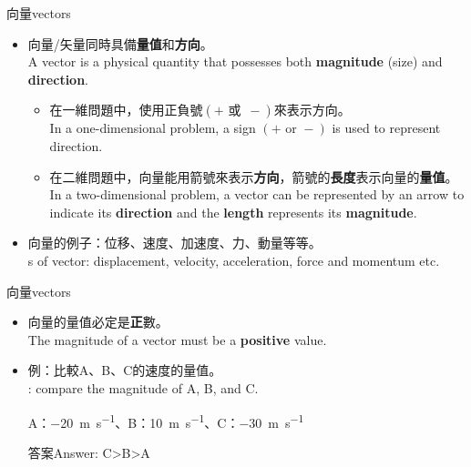 \documentclass[beamer=true]{standalone}
\begin{document}
\begin{frame}{向量vectors}
    \begin{itemize}
        \item 向量/矢量同時具備\textbf{量值}和\textbf{方向}。\\A vector is a physical quantity that possesses both \textbf{magnitude} (size) and \textbf{direction}.
              \begin{itemize}
                  \item 在一維問題中，使用正負號$(+ \textrm{ 或 }\, -)$來表示方向。\\In a one-dimensional problem, a sign $(+ \textrm{ or } -)$ is used to represent direction.
                  \item 在二維問題中，向量能用箭號來表示\textbf{方向}，箭號的\textbf{長度}表示向量的\textbf{量值}。\\In a two-dimensional problem, a vector can be represented by an arrow to indicate its \textbf{direction} and the \textbf{length} represents its \textbf{magnitude}.
              \end{itemize}
        \item 向量的例子：位移、速度、加速度、力、動量等等。\\s of vector: displacement, velocity, acceleration, force and momentum etc.
    \end{itemize}

\end{frame}


\begin{frame}{向量vectors}

    \begin{itemize}
        \item 向量的量值必定是\textbf{正}數。\\The magnitude of a vector must be a \textbf{positive} value.
        \item 例：比較A、B、C的速度的量值。\\: compare the magnitude of A, B, and C.\par A：\qty{-20}{m.s^{-1}}、B：\qty{10}{m.s^{-1}}、C：\qty{-30}{m.s^{-1}}\par 答案Answer: C>B>A
    \end{itemize}

\end{frame}
\end{document}
